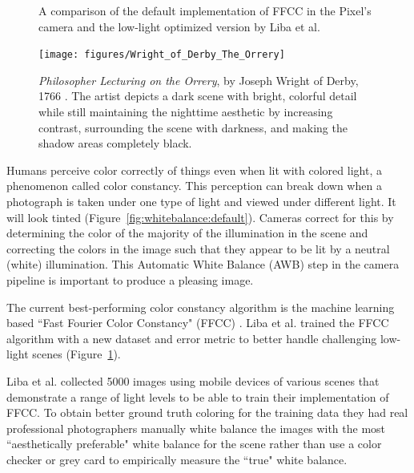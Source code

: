 \documentclass{sig-alternate}
\begin{document}
\begin{figure}
\caption{A comparison of the default implementation of FFCC in the Pixel's camera and the low-light optimized version by Liba et al.~\cite{blog:Levoy2018}}


\label{fig:whitebalance}
\end{figure}

\begin{figure}
\centering
\texttt{[image: figures/Wright\_of\_Derby\_The\_Orrery]}
\caption{ \emph{Philosopher Lecturing on the Orrery}, by Joseph Wright of Derby, 1766 \cite{file:theOrrery}. The artist depicts a dark scene with bright, colorful detail while still maintaining the nighttime aesthetic by increasing contrast, surrounding the scene with darkness, and making the shadow areas completely black.~\cite{blog:Wronski2018}}
\label{fig:theOrrery}
\end{figure}



Humans perceive color correctly of things even when lit with colored light, a phenomenon called color constancy. This perception can break down when a photograph is taken under one type of light and viewed under different light. It will look tinted (Figure~\ref{fig:whitebalance:default}).
Cameras correct for this by determining the color of the majority of the illumination in the scene and correcting the colors in the image such that they appear to be lit by a neutral (white) illumination. 
This Automatic White Balance (AWB) step in the camera pipeline is important to produce a pleasing image. \cite{Liba2019, blog:Levoy2018}

The current best-performing color constancy algorithm is the machine learning based ``Fast Fourier Color Constancy" (FFCC) \cite{Barron2017}.
Liba et al. trained the FFCC algorithm with a new dataset and error metric to better handle challenging low-light scenes (Figure~\ref{fig:whitebalance}).

Liba et al. collected 5000 images using mobile devices of various scenes that demonstrate a range of light levels to be able to train their implementation of FFCC. To obtain better ground truth coloring for the training data they had real professional photographers manually white balance the images with the most ``aesthetically preferable" white balance for the scene rather than use a color checker or grey card to empirically measure the ``true" white balance.~\cite{Liba2019}
\end{document}
